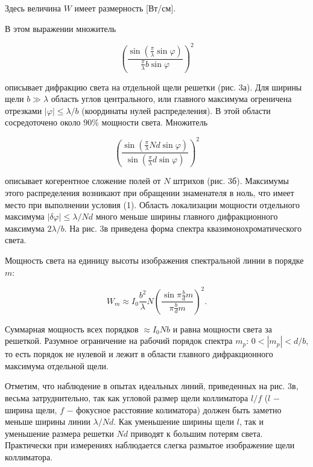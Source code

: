 \documentclass[a4paper,12pt]{article} %
\begin{document}
\hfill \break Здесь величина $W$ имеет размерность [Вт/см].

\hfill \break В этом выражении множитель

$$
\left( \frac{\sin{\left(\frac{\pi}{\lambda}\sin{\varphi} \right)}}{\frac{\pi}{\lambda} b\sin{\varphi}}\right)^2
$$

\hfill \break описывает дифракцию света на отдельной щели решетки (рис. 3а). Для ширины щели $b \gg \lambda$ область углов центрального, или главного максимума огреничена отрезками $|\varphi| \leq \lambda/b$ (координаты нулей распределения). В этой области сосредоточено около $90 \%$ мощности света. Множитель

$$
\left( \frac{ \sin{ \left( \frac{\pi}{\lambda} Nd\sin{\varphi} \right) } } { \sin{ \left( \frac{\pi}{\lambda} d \sin{\varphi} \right) } } \right)^2
$$

\hfill \break описывает когерентное сложение полей от $N$ штрихов (рис. 3б). Максимумы этого распределения возникают при обращении знаменателя в ноль, что имеет место при выполнении условия (1). Область локализации мощности отдельного максимума $|\delta \varphi | \leq \lambda/Nd$ много меньше ширины главного дифракционного максимума $2\lambda / b$. На рис. 3в приведена форма спектра квазимонохроматического света.

\hfill \break Мощность света на единицу высоты изображения спектральной линии в порядке $m$:

$$
W_{m} \approx I_{0} \frac{b^2}{\lambda} N \left( \frac{ \sin{ \pi \frac{b}{d} m } } { \pi \frac{b}{d} m } \right)^2.
$$

\hfill \break Суммарная мощность всех порядков $\approx I_{0}Nb$ и равна мощности света за решеткой. Разумное ограничение на рабочий порядок спектра $m_{p}$: $0 < |m_{p}| < d/b$, то есть порядок не нулевой и лежит в области главного дифракционного максимума отдельной щели.

\hfill \break Отметим, что наблюдение в опытах идеальных линий, приведенных на рис. 3в, весьма затруднительно, так как угловой размер щели коллиматора $l/f$ ($l$ $-$ ширина щели, $f$ $-$ фокусное расстояние колиматора) должен быть заметно меньше ширины линии $\lambda/Nd$. Как уменьшение ширины щели $l$, так и уменьшение размера решетки $Nd$ приводят к большим потерям света. Практически при измерениях наблюдается слегка размытое изображение щели коллиматора.
\end{document}
